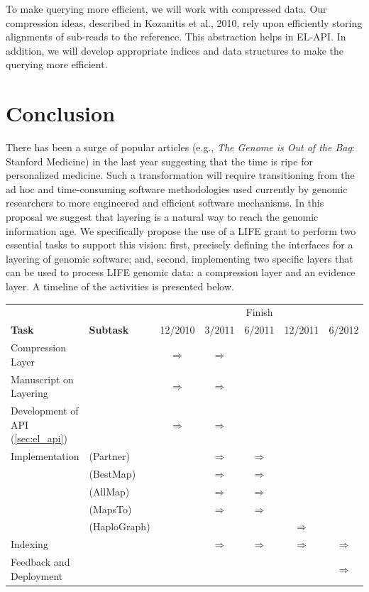 \documentclass[10pt]{article}
\begin{document}
To make querying more efficient, we will work with compressed
data. Our compression ideas, described in Kozanitis et al., 2010, rely
upon efficiently storing alignments of sub-reads to the
reference. This abstraction helps in EL-API. In addition, we will
develop appropriate indices and data structures to make the querying
more efficient.



\section{Conclusion}

There has been a surge of popular articles (e.g., {\em The Genome is
  Out of the Bag}: Stanford Medicine) in the last year suggesting that
the time is ripe for personalized medicine.  Such a transformation
will require transitioning from the ad hoc and time-consuming software
methodologies used currently by genomic researchers to more engineered and efficient
software mechanisms.  In this proposal we suggest that layering is a
natural way to reach the genomic information age.  We specifically
propose the use of a LIFE grant to perform two essential tasks to
support this vision: first, precisely defining the interfaces for a
layering of genomic software; and, second, implementing two specific
layers that can be used to process LIFE genomic data: a compression
layer and an evidence layer. A timeline of the activities
is presented below.\\


\begin{tabular}[h]{|l|l|ccccc|}\hline
  &&\multicolumn{5}{|c|}{Finish}\\\cline{3-7}
  {\bf Task } & {\bf Subtask}& 12/2010 & 3/2011 & 6/2011  & 12/2011 &  6/2012 \\\hline\hline
  Compression Layer && $\Rightarrow$ & $\Rightarrow$ & & & \\\hline
  Manuscript on Layering & & $\Rightarrow$ & $\Rightarrow$ & & & \\ \hline
  Development of API  (\ref{sec:el_api}) &  &$\Rightarrow$ &$\Rightarrow$ & & &\\\hline
  Implementation & ({\sc Partner})&  &$\Rightarrow$ &$\Rightarrow$ & & \\ 
  & ({\sc BestMap})&  &$\Rightarrow$ &$\Rightarrow$ & & \\ 
  & ({\sc AllMap})&  &$\Rightarrow$ &$\Rightarrow$ & & \\ 
  & ({\sc MapsTo})&  &$\Rightarrow$ &$\Rightarrow$ & & \\
  &({\sc HaploGraph})&  &  & &$\Rightarrow$  & \\\hline
  Indexing  & &  &$\Rightarrow$ &$\Rightarrow$ &$\Rightarrow$ &$\Rightarrow$  \\\hline
  Feedback and Deployment& &  & & & &$\Rightarrow$  \\ \hline
\end{tabular}
\end{document}
